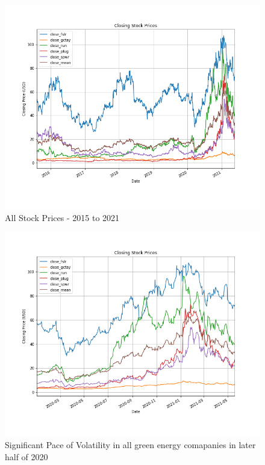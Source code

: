 \documentclass[sigconf, nonacm]{acmart}
\begin{document}
\begin{figure}[H]
  \centering
  \includegraphics[width=\linewidth]{all_stock_prices_and_mean/all_stock_prices_2015_2021.png}
  \caption{All Stock Prices - 2015 to 2021}
\end{figure}
\begin{figure}[H]
  \centering
  \includegraphics[width=\linewidth]{all_stock_prices_and_mean/all_stock_prices_2020_2021.png}
  \caption{Significant Pace of Volatility in all green energy comapanies in later half of 2020}
\end{figure}
\end{document}
